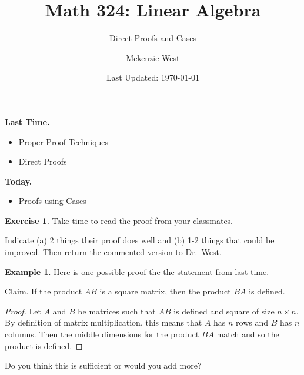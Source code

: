 \documentclass[handout]{beamer}
\newcommand{\fn}{\insertframenumber}
\theoremstyle{definition}
\newtheorem{exercise}{Exercise}
\newtheorem*{exa}{Example}
\begin{document}
	\title{Math 324: Linear Algebra}
	\subtitle{Direct Proofs and Cases}
	\author{Mckenzie West}
	\date{Last Updated: \today}
\begin{frame}
\maketitle
\end{frame}

\begin{frame}{\insertframenumber}
	\begin{block}{\textbf{Last Time.}}
	\begin{itemize}[label=--]
		\item Proper Proof Techniques
		\item Direct Proofs
	\end{itemize}
	\end{block}
\begin{block}{\textbf{Today.}}
	\begin{itemize}[label=--]
		\item Proofs using Cases
	\end{itemize}
\end{block}
\end{frame}
\begin{frame}{\fn}
	\begin{exercise}
		Take time to read the proof from your classmates. 
		
		Indicate (a) 2 things their proof does well and (b) 1-2 things that could be improved.  Then return the commented version to Dr.~West.
	\end{exercise}
\end{frame}
\begin{frame}{\fn}
	\begin{exa}
		Here is one possible proof the the statement from last time.
	\begin{block}{{Claim.}}
		If the product $AB$ is a square matrix, then the product $BA$ is defined.
	\end{block}
	\begin{proof} 
		Let $A$ and $B$ be matrices such that $AB$ is defined and square of size $n\times n$.  By definition of matrix multiplication, this means that $A$ has $n$ rows and $B$ has $n$ columns.  Then the middle dimensions for the product $BA$ match and so the product is defined.
	\end{proof}
		Do you think this is sufficient or would you add more?
	\end{exa}
\end{frame}
\end{document}
